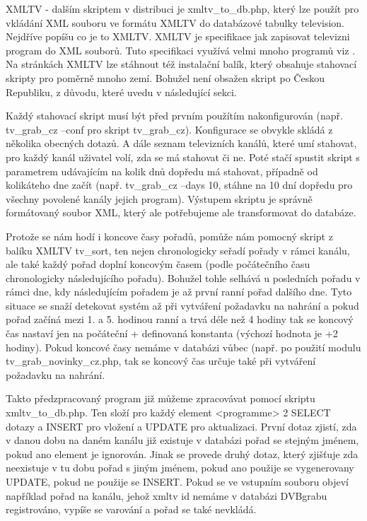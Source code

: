 XMLTV - dalším skriptem v distribuci je xmltv\_to\_db.php, který lze použít pro vkládání XML souboru ve formátu XMLTV do databázové tabulky television. Nejdříve popíšu co je to XMLTV. XMLTV je specifikace jak zapisovat televizni program do XML souborů. Tuto specifikaci využívá velmi mnoho programů viz \cite{xmltvURL}. Na stránkách XMLTV lze stáhnout též instalační balík, který obsahuje stahovací skripty pro poměrně mnoho zemí. Bohužel není obsažen skript po Českou Republiku, z důvodu, které uvedu v následující sekci.

\vspace{10pt}

Každý stahovací skript musí být před prvním použítím nakonfigurován (např. tv\_grab\_cz --conf pro skript tv\_grab\_cz). Konfigurace se obvykle skládá z několika obecných dotazů. A dále seznam televizních kanálů, které umí stahovat, pro každý kanál uživatel volí, zda se má stahovat či ne. Poté stačí spustit skript s parametrem udávajícím na kolik dnů dopředu má stahovat, případně od kolikáteho dne začít (např. tv\_grab\_cz --days 10, stáhne na 10 dní dopředu pro všechny povolené kanály jejich program). Výstupem skriptu je správně formátovaný soubor XML, který ale potřebujeme ale transformovat do databáze.

\vspace{10pt}

Protože se nám hodí i koncove časy pořadů, pomůže nám pomocný skript z balíku XMLTV tv\_sort, ten nejen chronologicky seřadí pořady v rámci kanálu, ale také každý pořad doplní koncovým časem (podle počátečního času chronologicky následujícího pořadu). Bohužel tohle selhává u posledních pořadu v rámci dne, kdy následujícím pořadem je až první ranní pořad dalšího dne. Tyto situace se snaží detekovat systém až při vytváření požadavku na nahrání a pokud pořad začíná mezi 1. a 5. hodinou ranní a trvá déle než 4 hodiny tak se koncový čas nastaví jen na počáteční + definovaná konstanta (výchozí hodnota je +2 hodiny). Pokud koncové časy nemáme v databázi vůbec (např. po použití modulu tv\_grab\_novinky\_cz.php, tak se koncový čas určuje také při vytváření požadavku na nahrání.

\vspace{10pt}

Takto předzpracovaný program již můžeme zpracovávat pomocí skriptu xmltv\_to\_db.php. Ten složí pro každý element <programme> 2 SELECT dotazy a INSERT pro vložení a UPDATE pro aktualizaci. První dotaz zjistí, zda v danou dobu na daném kanálu již existuje v databázi pořad se stejným jménem, pokud ano element je ignorován. Jinak se provede druhý dotaz, který zjišťuje zda neexistuje v tu dobu pořad s jiným jménem, pokud ano použije se vygenerovany UPDATE, pokud ne použije se INSERT. Pokud se ve vstupním souboru objeví například pořad na kanálu, jehož xmltv id nemáme v databázi DVBgrabu registrováno, vypíše se varování a pořad se také nevkládá.

